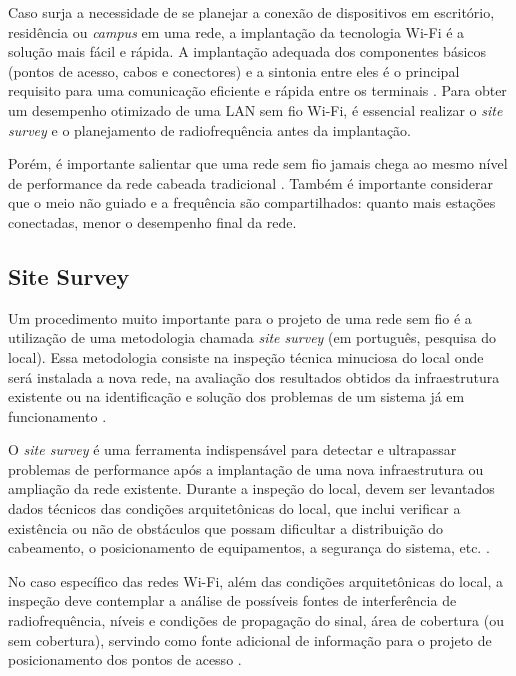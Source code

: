 Caso surja a necessidade de se planejar a conexão de dispositivos em escritório, residência ou \textit{campus} em uma rede, a implantação da tecnologia Wi-Fi é a solução mais fácil e rápida. A implantação adequada dos componentes básicos (pontos de acesso, cabos e conectores) e a sintonia entre eles é o principal requisito para uma comunicação eficiente e rápida entre os terminais \cite{kar2018ieee}. Para obter um desempenho otimizado de uma LAN sem fio Wi-Fi, é essencial realizar o \textit{site survey} e o planejamento de radiofrequência antes da implantação.

Porém, é importante salientar que uma rede sem fio jamais chega ao mesmo nível de performance da rede cabeada tradicional \cite{moraes2010}. Também é importante considerar que o meio não guiado e a frequência são compartilhados: quanto mais estações conectadas, menor o desempenho final da rede.

\subsection{Site Survey}
\label{subsec:site-survey}

Um procedimento muito importante para o projeto de uma rede sem fio é a utilização de uma metodologia chamada \textit{site survey} (em português, pesquisa do local). Essa metodologia consiste na inspeção técnica minuciosa do local onde será instalada a nova rede, na avaliação dos resultados obtidos da infraestrutura existente ou na identificação e solução dos problemas de um sistema já em funcionamento \cite{pinheiro2004site}.

O \textit{site survey} é uma ferramenta indispensável para detectar e ultrapassar problemas de performance após a implantação de uma nova infraestrutura ou ampliação da rede existente. Durante a inspeção do local, devem ser levantados dados técnicos das condições arquitetônicas do local, que inclui verificar a existência ou não de obstáculos que possam dificultar a distribuição do cabeamento, o posicionamento de equipamentos, a segurança do sistema, etc. \cite{moraes2010,pinheiro2004site}.

No caso específico das redes Wi-Fi, além das condições arquitetônicas do local, a inspeção deve contemplar a análise de possíveis fontes de interferência de radiofrequência, níveis e condições de propagação do sinal, área de cobertura (ou sem cobertura), servindo como fonte adicional de informação para o projeto de posicionamento dos pontos de acesso \cite{pinheiro2004site}. 

